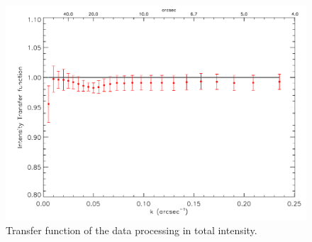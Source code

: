 \documentclass[twocolumn,traditabstract]{aa}
\begin{document}
\begin{figure}[h!]
  \centering
  \includegraphics[width=1\linewidth,keepaspectratio]{figures/Crab_transfer_func.pdf}
        \caption{Transfer function of the data processing in total intensity.}
\label{transfer_func}
\end{figure}
  
\end{document}
